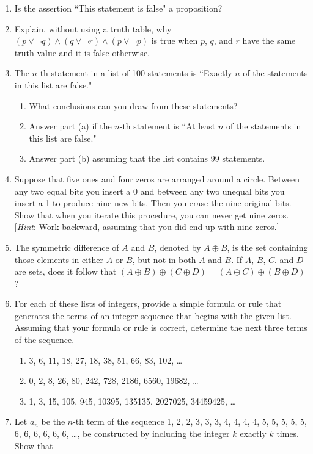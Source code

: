 \documentclass[11pt]{article}
\begin{document}
\begin{enumerate}
    \item Is the assertion ``This statement is false" a proposition?
    \item Explain, without using a truth table, why $(p \vee \neg q) \wedge (q \vee \neg r) \wedge (p \vee \neg p)$ is true when $p$, $q$, and $r$ have the same truth value and it is false otherwise.
    \item The $n$-th statement in a list of 100 statements is ``Exactly $n$ of the statements in this list are false."
    \begin{enumerate}
        \item What conclusions can you draw from these statements?
        \item Answer part (a) if the $n$-th statement is ``At least $n$ of the statements in this list are false."
        \item Answer part (b) assuming that the list contains 99 statements.
    \end{enumerate}
    \item Suppose that five ones and four zeros are arranged around a circle. Between any two equal bits you insert a 0 and between any two unequal bits you insert a 1 to produce nine new bits. Then you erase the nine original bits. Show that when you iterate this procedure, you can never get nine zeros. [\textit{Hint}: Work backward, assuming that you did end up with nine zeros.]
    \item The symmetric difference of $A$ and $B$, denoted by $A \oplus B$, is the set containing those elements in either $A$ or $B$, but not in both $A$ and $B$. If $A$, $B$, $C$. and $D$ are sets, does it follow that $(A \oplus B) \oplus (C \oplus D) = (A \oplus C) \oplus (B \oplus D)$?
    \item For each of these lists of integers, provide a simple formula or rule that generates the terms of an integer sequence that begins with the given list. Assuming that your formula or rule is correct, determine the next three terms of the sequence.
    \begin{enumerate}
        \item 3, 6, 11, 18, 27, 18, 38, 51, 66, 83, 102, \ldots
        \item 0, 2, 8, 26, 80, 242, 728, 2186, 6560, 19682, \ldots
        \item 1, 3, 15, 105, 945, 10395, 135135, 2027025, 34459425, \ldots
    \end{enumerate}
    \item Let $a_n$ be the $n$-th term of the sequence 1, 2, 2, 3, 3, 3, 4, 4, 4, 4, 5, 5, 5, 5, 5, 6, 6, 6, 6, 6, 6, \ldots, be constructed by including the integer $k$ exactly $k$ times. Show that

\end{enumerate}
\end{document}
